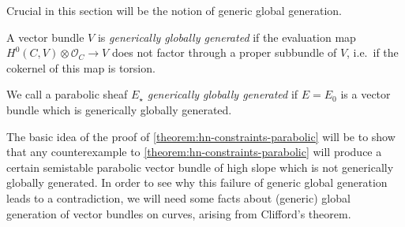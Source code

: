 Crucial in this section will be the notion of generic global generation.

\begin{definition}
\notready
	\label{definition:}
	A vector bundle $V$ is {\em generically globally generated} if the
evaluation map $H^0(C, V) \otimes \mathscr O_C \to V$ does not factor through a proper
subbundle of $V$, i.e.~if the cokernel of this map is torsion.

We call a parabolic sheaf $E_\star$ {\em generically globally generated} if $E =
E_0$ is a vector bundle which is generically globally generated.
\end{definition}

The basic idea of the proof of \autoref{theorem:hn-constraints-parabolic} will be to show that any counterexample to
\autoref{theorem:hn-constraints-parabolic} will produce a certain semistable parabolic vector bundle of high
slope which is not generically globally generated.
In order to see why this failure of generic global generation
leads to a contradiction, we will need some facts about (generic) global generation of vector bundles on curves, arising from Clifford's theorem.

